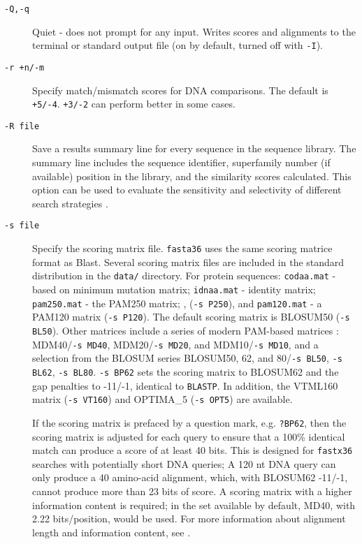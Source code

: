 \documentclass[11pt]{article}
\begin{document}
\begin{description}
\item[\texttt{-Q,-q}]
Quiet - does not prompt for any input.  Writes scores and alignments
to the terminal or standard output file (on by default, turned off
with \texttt{-I}).
\item[\texttt{-r +n/-m}]
Specify match/mismatch scores for DNA comparisons.  The default is
\texttt{+5/-4}. \texttt{+3/-2} can perform better in some cases.
\item[\texttt{-R file}]
Save a results summary line for every sequence in the sequence
library.  The summary line includes the sequence identifier,
superfamily number (if available) position 
in the library, and the similarity scores calculated.  This option can
be used to evaluate the sensitivity and selectivity of different
search strategies \cite{wrp951,wrp981}.
\item[\texttt{-s file}] Specify the scoring matrix file.
  \texttt{fasta36} uses the same scoring matrice format as Blast.
  Several scoring matrix files are included in the standard
  distribution in the \texttt{data/} directory.  For protein
  sequences: \texttt{codaa.mat} - based on minimum mutation matrix;
  \texttt{idnaa.mat} - identity matrix; \texttt{pam250.mat} - the
  PAM250 matrix; \cite{day787}, (\texttt{-s P250}), and
  \texttt{pam120.mat} - a PAM120 matrix (\texttt{-s P120}).  The
  default scoring matrix is BLOSUM50 (\texttt{-s BL50}). Other
  matrices include a series of modern PAM-based matrices
  \cite{tay925}: MDM40/\texttt{-s MD40}, MDM20/\texttt{-s MD20}, and
  MDM10/\texttt{-s MD10}, and a selection from the BLOSUM series
  \cite{hen929} BLOSUM50, 62, and 80/\texttt{-s BL50}, \texttt{-s
    BL62}, \texttt{-s BL80}.  \texttt{-s BP62} sets the scoring matrix
  to BLOSUM62 and the gap penalties to -11/-1, identical to
  \texttt{BLASTP}.  In addition, the VTML160 matrix (\texttt{-s
    VT160}) \cite{muller2002} and OPTIMA\_5 (\texttt{-s OPT5})
  \cite{kan023} are available.

If the scoring matrix is prefaced by a question mark,
e.g. \texttt{?BP62}, then the scoring matrix is adjusted for each
query to ensure that a 100\% identical match can produce a score of at
least 40 bits.  This is designed for \texttt{fastx36} searches with
potentially short DNA queries; A 120 nt DNA query can only produce a
40 amino-acid alignment, which, with BLOSUM62 -11/-1, cannot produce
more than 23 bits of score. A scoring matrix with a higher information
content is required; in the set available by default, MD40, with 2.22
bits/position, would be used.  For more information about alignment
length and information content, see \cite{alt915}.


\end{description}
\end{document}
